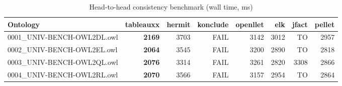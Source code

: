 \begin{table}[t]
\centering
\caption{Head-to-head consistency benchmark (wall time, ms)}
\label{tab:head_to_head_wall_ms}
\begin{tabular}{lrrrrrrr}
\toprule
Ontology & tableauxx & hermit & konclude & openllet & elk & jfact & pellet \\
\midrule
0001\_UNIV-BENCH-OWL2DL.owl & \textbf{2169} & 3703 & FAIL & 3142 & 3012 & TO & 2957 \\
0002\_UNIV-BENCH-OWL2EL.owl & \textbf{2064} & 3545 & FAIL & 3200 & 2890 & TO & 2818 \\
0003\_UNIV-BENCH-OWL2QL.owl & \textbf{2076} & 3314 & FAIL & 3261 & 2820 & 3308 & 2866 \\
0004\_UNIV-BENCH-OWL2RL.owl & \textbf{2070} & 3566 & FAIL & 3157 & 2954 & TO & 2864 \\
\bottomrule
\end{tabular}
\end{table}
